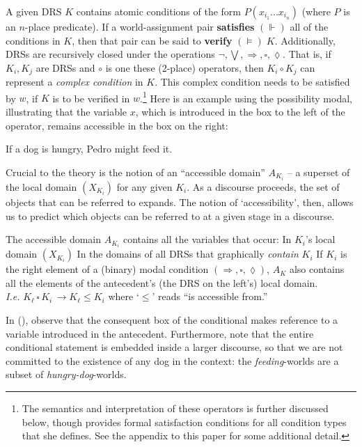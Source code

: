 A given DRS $ K $ contains atomic conditions of the form $ P(x_{i_1}...x_{i_n}) $ (where $ P $ is an $ n $-place predicate). If a world-assignment pair \textbf{satisfies} $ (\boldsymbol\Vdash) $ all of the conditions in $ K $, then that pair can be said to \textbf{verify} $ (\boldsymbol\vDash)\;K$. Additionally, DRSs are recursively closed under the operations $ \neg,\bigvee,\Rightarrow,\square,\lozenge $. That is, if $ K_i,K_j $ are DRSs and $ \circ $ is one these (2-place) operators, then $ K_i\circ K_j $ can represent a \textit{complex condition} in $ K $. This complex condition needs to be satisfied by $ w $, if $ K $ is to be verified in $ w $.\footnote{The semantics and interpretation of these operators is further discussed below, though \citet[714]{Roberts1989} provides formal satisfaction conditions for all condition types that she defines. See the appendix to this paper for some additional detail.} Here is an example using the possibility modal, illustrating that the variable $x$, which is introduced in the box to the left of the operator, remains accessible in the box on the right: 


\pex  \label{donkey} \label{drs-if} If a dog is hungry, Pedro might feed it. \\
\xe

Crucial to the theory is the notion of an ``accessible domain'' $ A_{K_i} $ -- a superset of the local domain $ (X_{K_i}) $ for any given $ K_i $. As a discourse proceeds, the set of objects that can be referred to expands. The notion of `accessibility', then, allows us to predict which objects can be referred to at a given stage in a discourse. 

\pex  The accessible domain $ A_{K_i} $ contains all the variables that occur: 
\a  In $ K_i $'s local domain $ (X_{K_i}) $
\a  In the domains of all DRSs that graphically \textit{contain} $ K_i $
\a  If $ K_i $ is the right element of a (binary) modal condition $(\Rightarrow,\square,\lozenge)$, $ A_K $ also contains all the elements of the antecedent's (the DRS on the left's) local domain.\\\textit{I.e.} $ K_\ell\,\square\,K_i\, \longrightarrow K_\ell\leqslant K_i$ where `$ \leqslant $' reads ``is accessible from.''\xe

In (\blastx), observe that the consequent box of the conditional makes reference to a variable introduced in the antecedent. Furthermore, note that the entire conditional statement is embedded inside a larger discourse, so that we are not committed to the existence of any dog in the context: the \textit{feeding}-worlds are a subset of \textit{hungry-dog}-worlds.

